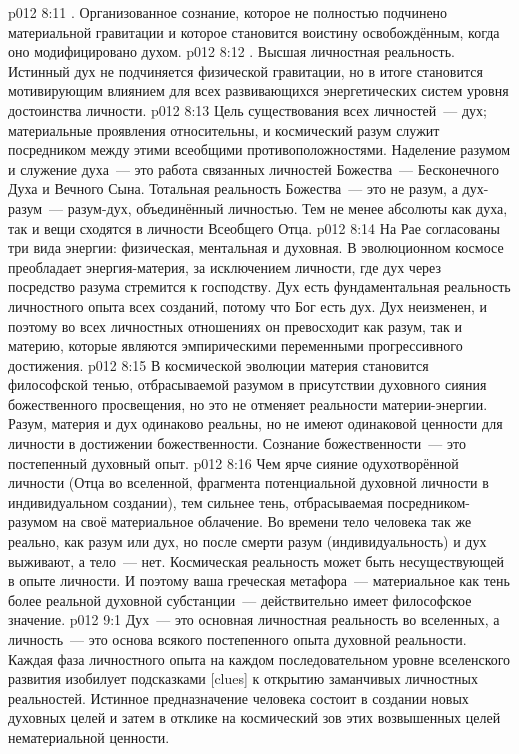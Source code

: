 \vs p012 8:11 . Организованное сознание, которое не полностью подчинено материальной гравитации и которое становится воистину освобождённым, когда оно модифицировано духом.
\vs p012 8:12 . Высшая личностная реальность. Истинный дух не подчиняется физической гравитации, но в итоге становится мотивирующим влиянием для всех развивающихся энергетических систем уровня достоинства личности.
\vs p012 8:13 \pc Цель существования всех личностей~--- дух; материальные проявления относительны, и космический разум служит посредником между этими всеобщими противоположностями. Наделение разумом и служение духа~--- это работа связанных личностей Божества~--- Бесконечного Духа и Вечного Сына. Тотальная реальность Божества~--- это не разум, а дух\hyp{}разум~--- разум\hyp{}дух, объединённый личностью. Тем не менее абсолюты как духа, так и вещи сходятся в личности Всеобщего Отца.
\vs p012 8:14 \pc На Рае согласованы три вида энергии: физическая, ментальная и духовная. В эволюционном космосе преобладает энергия\hyp{}материя, за исключением личности, где дух через посредство разума стремится к господству. Дух есть фундаментальная реальность личностного опыта всех созданий, потому что Бог есть дух. Дух неизменен, и поэтому во всех личностных отношениях он превосходит как разум, так и материю, которые являются эмпирическими переменными прогрессивного достижения.
\vs p012 8:15 В космической эволюции материя становится философской тенью, отбрасываемой разумом в присутствии духовного сияния божественного просвещения, но это не отменяет реальности материи\hyp{}энергии. Разум, материя и дух одинаково реальны, но не имеют одинаковой ценности для личности в достижении божественности. Сознание божественности~--- это постепенный духовный опыт.
\vs p012 8:16 Чем ярче сияние одухотворённой личности (Отца во вселенной, фрагмента потенциальной духовной личности в индивидуальном создании), тем сильнее тень, отбрасываемая посредником\hyp{}разумом на своё материальное облачение. Во времени тело человека так же реально, как разум или дух, но после смерти разум (индивидуальность) и дух выживают, а тело~--- нет. Космическая реальность может быть несуществующей в опыте личности. И поэтому ваша греческая метафора~--- материальное как тень более реальной духовной субстанции~--- действительно имеет философское значение.
\vs p012 9:1 Дух~--- это основная личностная реальность во вселенных, а личность~--- это основа всякого постепенного опыта духовной реальности. Каждая фаза личностного опыта на каждом последовательном уровне вселенского развития изобилует подсказками [clues] к открытию заманчивых личностных реальностей. Истинное предназначение человека состоит в создании новых духовных целей и затем в отклике на космический зов этих возвышенных целей нематериальной ценности.
